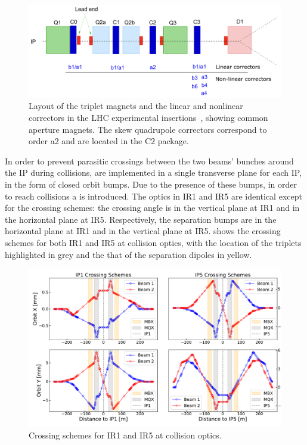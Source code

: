 \begin{figure}[!hbt]
  \centering
  \includegraphics*[width=0.95\linewidth]{Figures/Optics_Measurements_Corrections_at_LHC/corrector_package.png}
  \caption{Layout of the triplet magnets and the linear and nonlinear correctors in the LHC experimental insertions~\cite{CERN:Bruning:Dynap_Studies}, showing common aperture magnets. The skew quadrupole correctors correspond to order a\num{2} and are located in the C\num{2} package.}
  \label{figure:lhc_ir_corrector_layout}
\end{figure}

In order to prevent parasitic crossings between the two beams' bunches around the IP during collisions,  are implemented in a single transverse plane for each IP, in the form of closed orbit bumps.
Due to the presence of these bumps, in order to reach collisions a  is introduced.
The optics in IR\num{1} and IR\num{5} are identical except for the crossing schemes: the crossing angle is in the vertical plane at IR\num{1} and in the horizontal plane at IR\num{5}.
Respectively, the separation bumps are in the horizontal plane at IR\num{1} and in the vertical plane at IR\num{5}.
 shows the crossing schemes for both IR\num{1} and IR\num{5} at collision optics, with the location of the triplets highlighted in grey and the that of the separation dipoles in yellow.

\begin{figure}[!hbt]
  \centering
  \includegraphics*[width=0.99\linewidth]{Figures/Optics_Measurements_Corrections_at_LHC/lhc_crossing_schemes_ip15.pdf}
  \caption{Crossing schemes for IR\num{1} and IR\num{5} at collision optics.}
  \label{figure:lhc_crossing_schemes_ip15}
\end{figure}

